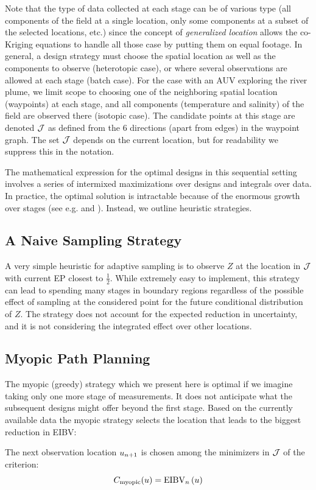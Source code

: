 \documentclass[aoas]{imsart}
\begin{document}
Note that the type of data collected at each stage can be of various type (all components of the field at a single location, only some components at a subset of the selected locations, etc.) since the concept of \textit{generalized location} allows the co-Kriging equations to handle all those case by putting them on equal footage.
In general, a design strategy must choose the spatial location as well as the components to observe (heterotopic case), or where several observations are allowed at each stage (batch case).
For the case with an AUV exploring the river plume, we limit scope to choosing one of the neighboring spatial location (waypoints) at each stage, and all components (temperature and salinity) of the field are observed there (isotopic case). The candidate points at this stage are denoted $\mathcal{J}$ as defined from the 6 directions (apart from edges) in the waypoint graph. The set $\mathcal{J}$ depends on the current location, but for readability we suppress this in the notation. 

The mathematical expression for the optimal designs in this sequential setting involves a series
of intermixed maximizations over designs and integrals over data. In
practice, the optimal solution is intractable because of the enormous
growth over stages (see e.g. \cite{sucar2015probabilistic} and
\cite{powell2016perspectives}).  Instead, we outline heuristic
strategies.



\subsection{A Naive Sampling Strategy}
\label{naive}

A very simple heuristic for adaptive sampling is to observe $Z$ at the location in $\mathcal{J}$ with current EP closest to $\frac{1}{2}$. While extremely easy to implement, this strategy can lead to spending many stages in boundary regions regardless of the possible effect of sampling at the considered point for the future conditional distribution of $Z$. The strategy does not account for the expected reduction in uncertainty, and it is not considering the integrated effect over other locations.  


\subsection{Myopic Path Planning}
\label{sec:myopic}

The myopic (greedy) strategy which we present here is optimal if we
imagine taking only one more stage of measurements. It does not anticipate what the subsequent
designs might offer beyond the first stage.
Based on the currently available data the myopic strategy selects the location that leads to the biggest reduction in EIBV:
\begin{criterion}[Myopic]
The next observation location $u_{n + 1}$ is chosen among the minimizers in $\mathcal{J}$ of the criterion:
\begin{equation}\label{critSEQ}
     C_{\text{myopic}}(u) = \EIBV_{\stage}\left(\spatloc\right)
\end{equation}
\end{criterion}
\end{document}
